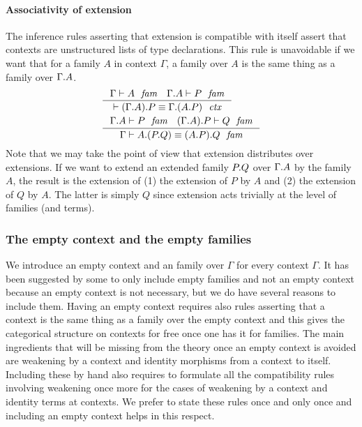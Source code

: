 \paragraph{Associativity of extension}
\label{comp-ee}
The inference rules asserting that extension is compatible with itself assert
that contexts are unstructured lists of type declarations. This rule is
unavoidable if we want that for a family $A$ in context $\Gamma$, a family over
$A$ is the same thing as a family over $\ctxext{\Gamma}{A}$. 
\begin{align}
& \inference
  { \jfam{\Gamma}{A}
    \jfam{{\Gamma}{A}}{P}
    }
  { \jctxeq{\ctxext{{\Gamma}{A}}{P}}{\ctxext{\Gamma}{{A}{P}}}
    }
  \\
& \inference
  { \jfam{{\Gamma}{A}}{P}
    \jfam{{{\Gamma}{A}}{P}}{Q}
    }
  { \jfameq{\Gamma}{\ctxext{A}{{P}{Q}}}{\ctxext{{A}{P}}{Q}}
    }
  \label{comp-ee-c}
\end{align}
Note that we may take the point of view that extension distributes over
extensions. If we want to extend an extended family $\ctxext{P}{Q}$ over
$\ctxext{\Gamma}{A}$ by the family $A$, the result is the extension of (1)
the extension of $P$ by $A$ and (2) the extension of $Q$ by $A$. The latter is
simply $Q$ since extension acts trivially at the level of families (and terms).

\subsubsection{The empty context and the empty families}
\label{empty}
We introduce an empty context and an family over $\Gamma$ for every context $\Gamma$. 
It has been suggested by some to only include empty families and not an
empty context because an empty context is not necessary, but we do have several
reasons to include them. Having an empty context requires also rules asserting 
that a context is the same thing as a family over the empty context and this
gives the categorical structure on contexts for free once one has it for 
families. The main ingredients that will be missing from the theory once an
empty context is avoided are weakening by a context and identity morphisms from
a context to itself. Including these by hand also requires to formulate all the
compatibility rules involving weakening once more for the cases of weakening by
a context and identity terms at contexts. We prefer to state these rules once
and only once and including an empty context helps in this respect.

